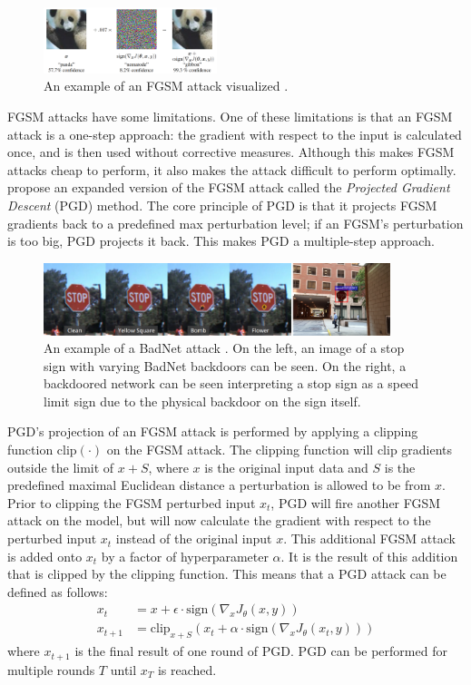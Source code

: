 \documentclass[11pt]{article}
\begin{document}
\begin{figure}[h]
  \centering
  \includegraphics[width=0.45\textwidth]{fgsm.png}
  \caption{An example of an FGSM attack visualized \citep{goodfellow2015explaining}.}
  \label{fig:fgsm}
\end{figure}

FGSM attacks have some limitations.
One of these limitations is that an FGSM attack is a one-step approach: the gradient with respect to the input is calculated once, and is then used without corrective measures.
Although this makes FGSM attacks cheap to perform, it also makes the attack difficult to perform optimally.
\citet{madry2018towards} propose an expanded version of the FGSM attack called the \textit{Projected Gradient Descent} (PGD) method.
The core principle of PGD is that it projects FGSM gradients back to a predefined max perturbation level; if an FGSM's perturbation is too big, PGD projects it back.
This makes PGD a multiple-step approach.

\begin{figure}
  \centering
  \includegraphics[width=0.9\textwidth]{badnet.png}
  \caption{An example of a BadNet attack \citep{gu2019badnets}. On the left, an image of a stop sign with varying BadNet backdoors can be seen. On the right, a backdoored network can be seen interpreting a stop sign as a speed limit sign due to the physical backdoor on the sign itself.}
  \label{fig:badnet}
\end{figure}

PGD's projection of an FGSM attack is performed by applying a clipping function $\text{clip}(\cdot)$ on the FGSM attack.
The clipping function will clip gradients outside the limit of $x + S$, where $x$ is the original input data and $S$ is the predefined maximal Euclidean distance a perturbation is allowed to be from $x$.
Prior to clipping the FGSM perturbed input $x_t$, PGD will fire another FGSM attack on the model, but will now calculate the gradient with respect to the perturbed input $x_t$ instead of the original input $x$.
This additional FGSM attack is added onto $x_t$ by a factor of hyperparameter $\alpha$.
It is the result of this addition that is clipped by the clipping function.
This means that a PGD attack can be defined as follows:
\begin{align*}
  x_t &= x + \epsilon \cdot \text{sign}(\nabla_x J_\theta(x, y)) \\
  x_{t+1} &= \text{clip}_{x + S}(x_t + \alpha \cdot \text{sign}(\nabla_x J_\theta(x_t, y)))
\end{align*}
where $x_{t+1}$ is the final result of one round of PGD.
PGD can be performed for multiple rounds $T$ until $x_T$ is reached. 
\end{document}
